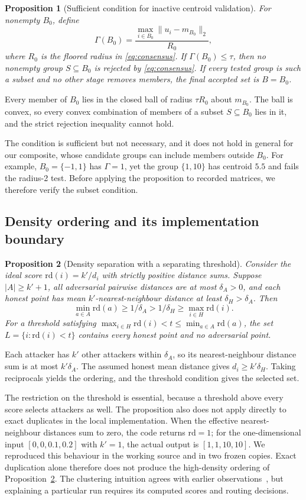 \documentclass[journal]{IEEEtran}
\newtheorem{proposition}{Proposition}
\newcommand{\rd}{\mathrm{rd}}
\begin{document}
\begin{proposition}[Sufficient condition for inactive centroid validation]\label{prop:vacuity}
For nonempty $B_0$, define
\[
\Gamma(B_0)=\frac{\max_{i\in B_0}\|u_i-m_{B_0}\|_2}{R_0},
\]
where $R_0$ is the floored radius in \eqref{eq:consensus}. If $\Gamma(B_0)\leq\tau$, then no nonempty group $S\subseteq B_0$ is rejected by \eqref{eq:consensus}. If every tested group is such a subset and no other stage removes members, the final accepted set is $B=B_0$.
\end{proposition}
\begin{IEEEproof}
Every member of $B_0$ lies in the closed ball of radius $\tau R_0$ about $m_{B_0}$. The ball is convex, so every convex combination of members of a subset $S\subseteq B_0$ lies in it, and the strict rejection inequality cannot hold.
\end{IEEEproof}
The condition is sufficient but not necessary, and it does not hold in general for our composite, whose candidate groups can include members outside $B_0$. For example, $B_0=\{-1,1\}$ has $\Gamma=1$, yet the group $\{1,10\}$ has centroid $5.5$ and fails the radius-2 test. Before applying the proposition to recorded matrices, we therefore verify the subset condition.

\subsection{Density ordering and its implementation boundary}
\begin{proposition}[Density separation with a separating threshold]\label{prop:density}
Consider the ideal score $\rd(i)=k'/d_i$ with strictly positive distance sums. Suppose $|A|\geq k'+1$, all adversarial pairwise distances are at most $\delta_A>0$, and each honest point has mean $k'$-nearest-neighbour distance at least $\delta_H>\delta_A$. Then
\[
\min_{a\in A}\rd(a)\geq1/\delta_A>1/\delta_H\geq\max_{i\in H}\rd(i).
\]
For a threshold satisfying $\max_{i\in H}\rd(i)<t\leq\min_{a\in A}\rd(a)$, the set $L=\{i:\rd(i)<t\}$ contains every honest point and no adversarial point.
\end{proposition}
\begin{IEEEproof}
Each attacker has $k'$ other attackers within $\delta_A$, so its nearest-neighbour distance sum is at most $k'\delta_A$. The assumed honest mean distance gives $d_i\geq k'\delta_H$. Taking reciprocals yields the ordering, and the threshold condition gives the selected set.
\end{IEEEproof}
The restriction on the threshold is essential, because a threshold above every score selects attackers as well. The proposition also does not apply directly to exact duplicates in the local implementation. When the effective nearest-neighbour distances sum to zero, the code returns $\rd=1$; for the one-dimensional input $[0,0,0.1,0.2]$ with $k'=1$, the actual output is $[1,1,10,10]$. We reproduced this behaviour in the working source and in two frozen copies. Exact duplication alone therefore does not produce the high-density ordering of Proposition~\ref{prop:density}. The clustering intuition agrees with earlier observations~\cite{bellachia2026sok}, but explaining a particular run requires its computed scores and routing decisions.
\end{document}
